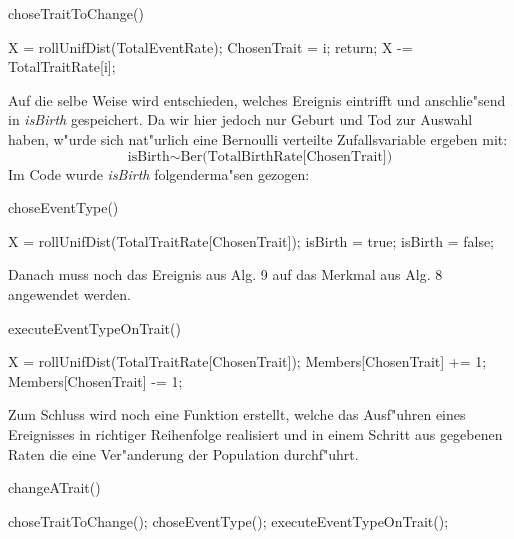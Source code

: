 \documentclass[11pt, a4paper, german]{article}
\theoremstyle{plain}
\begin{document}
	\begin{algorithm}[H]
 		\caption{choseTraitToChange()}
 		\begin{algorithmic}[1]
 			\State X = rollUnifDist(TotalEventRate);
 					\State ChosenTrait = i;
 					\State return;
 				\EndIf
 				\State X -= TotalTraitRate[i];
 			\EndFor
 		\end{algorithmic}
 	\end{algorithm}
 	Auf die selbe Weise wird entschieden, welches Ereignis eintrifft und anschlie"send in \textit{isBirth} gespeichert. Da wir hier jedoch nur Geburt und Tod zur Auswahl haben, w"urde sich nat"urlich eine Bernoulli verteilte Zufallsvariable ergeben mit:
 	\[ \text{isBirth} \sim \text{Ber(TotalBirthRate[ChosenTrait])} \]
 	Im Code wurde \textit{isBirth} folgenderma"sen gezogen:
	\begin{algorithm}[H]
 		\caption{choseEventType()}
 		\begin{algorithmic}[1]
 			\State X = rollUnifDist(TotalTraitRate[ChosenTrait]);
 				\State isBirth = true;
 			\Else
 				\State isBirth = false;
 			\EndIf
 		\end{algorithmic}
 	\end{algorithm}
 	Danach muss noch das Ereignis aus Alg. 9 auf das Merkmal aus Alg. 8 angewendet werden.
	\begin{algorithm}[H]
 		\caption{executeEventTypeOnTrait()}
 		\begin{algorithmic}[1]
 			\State X = rollUnifDist(TotalTraitRate[ChosenTrait]);
 				\State Members[ChosenTrait] += 1;
 			\EndIf
 				\State Members[ChosenTrait] -= 1;
 			\EndIf
 		\end{algorithmic}
 	\end{algorithm} 	
 	Zum Schluss wird noch eine Funktion erstellt, welche das Ausf"uhren eines Ereignisses in richtiger Reihenfolge realisiert und in einem Schritt aus gegebenen Raten die eine Ver"anderung der Population durchf"uhrt.
 	\begin{algorithm}[H]
 		\caption{changeATrait()}
 		\begin{algorithmic}[1]
 			\State choseTraitToChange();
 			\State choseEventType();
 			\State executeEventTypeOnTrait();
 		\end{algorithmic}
 	\end{algorithm} 
\end{document}
